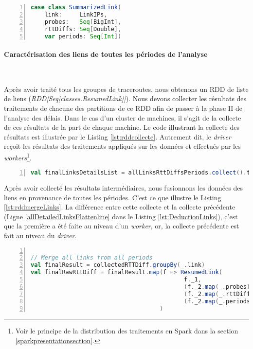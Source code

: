 \begin{lstlisting}[language=scala,firstnumber=1, caption={Définition de la classe ResumedLink},label={lst:ResumedLinkClasscase}, basicstyle = \footnotesize,escapechar=|,numbers=left,
stepnumber=1]
case class SummarizedLink(
	link:     LinkIPs,
	probes:   Seq[BigInt],
	rttDiffs: Seq[Double],
	var periods: Seq[Int])
\end{lstlisting}


\paragraph{Caractérisation des liens de toutes les périodes de l'analyse}~

Après avoir traité tous les groupes de traceroutes, nous obtenons un RDD de liste de liens (\textit{RDD[Seq[classes.ResumedLink]]}). Nous devons collecter les résultats des traitements de chacune des partitions de ce RDD afin de passer à la phase II de l'analyse des délais. Dans le cas d'un cluster de machines, il s'agit de la collecte de ces résultats de la part de chaque machine.  
Le code illustrant la collecte des résultats est illustrée par le Listing \ref{lst:rddcollecte}. Autrement dit, le \textit{driver}  reçoit les résultats des traitements appliqués sur les données et effectués par les \textit{workers}\footnote{Voir le principe de la distribution des traitements en Spark dans la section \ref{sparkpresentationsection}.}.

\begin{lstlisting}[language=scala,firstnumber=1, caption={Collecte des résultats intermédiares },label={lst:rddcollecte}, basicstyle = \footnotesize,escapechar=|,numbers=left,
stepnumber=1]
val finalLinksDetailsList = allLinksRttDiffsPeriods.collect().toSeq.flatten
\end{lstlisting}

Après avoir collecté les résultats intermédiaires, nous fusionnons les données des liens en provenance de toutes les périodes. C'est ce que illustre le Listing \ref{lst:rddmergeLinks}. La différence entre cette collecte et la collecte précédente (Ligne \ref{allDetailedLinksFlattenline} dans le Listing \ref{lst:DeductionLinks}), c'est que la première a été faite au niveau d'un \textit{worker}, or, la collecte précédente est fait au niveau du \textit{driver}.

\begin{lstlisting}[language=scala,firstnumber=1, caption={Fusion des liens de toute la période de l'analyse},label={lst:rddmergeLinks}, basicstyle = \footnotesize,escapechar=|,numbers=left,
stepnumber=1]

// Merge all links from all periods
val finalResult = collectedRTTDiff.groupBy(_.link)
val finalRawRttDiff = finalResult.map(f => ResumedLink(
                                            f._1, 
                                            (f._2.map(_.probes)).flatten, 
                                            (f._2.map(_.rttDiffs)).flatten, 
                                            (f._2.map(_.periods)).flatten)
                                     )
\end{lstlisting}

